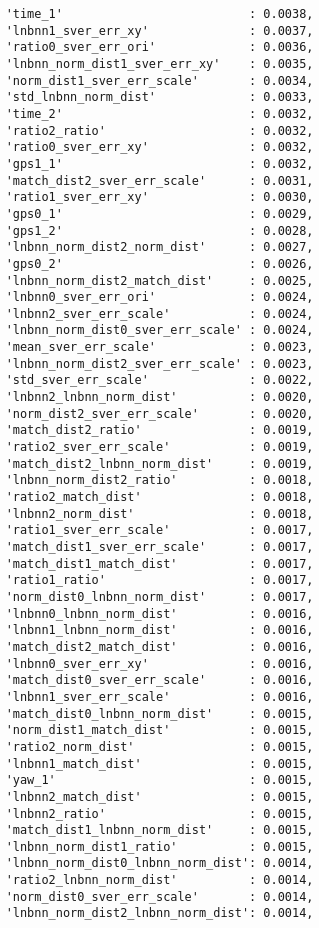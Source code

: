 \begin{verbatim}
    'time_1'                          : 0.0038,
    'lnbnn1_sver_err_xy'              : 0.0037,
    'ratio0_sver_err_ori'             : 0.0036,
    'lnbnn_norm_dist1_sver_err_xy'    : 0.0035,
    'norm_dist1_sver_err_scale'       : 0.0034,
    'std_lnbnn_norm_dist'             : 0.0033,
    'time_2'                          : 0.0032,
    'ratio2_ratio'                    : 0.0032,
    'ratio0_sver_err_xy'              : 0.0032,
    'gps1_1'                          : 0.0032,
    'match_dist2_sver_err_scale'      : 0.0031,
    'ratio1_sver_err_xy'              : 0.0030,
    'gps0_1'                          : 0.0029,
    'gps1_2'                          : 0.0028,
    'lnbnn_norm_dist2_norm_dist'      : 0.0027,
    'gps0_2'                          : 0.0026,
    'lnbnn_norm_dist2_match_dist'     : 0.0025,
    'lnbnn0_sver_err_ori'             : 0.0024,
    'lnbnn2_sver_err_scale'           : 0.0024,
    'lnbnn_norm_dist0_sver_err_scale' : 0.0024,
    'mean_sver_err_scale'             : 0.0023,
    'lnbnn_norm_dist2_sver_err_scale' : 0.0023,
    'std_sver_err_scale'              : 0.0022,
    'lnbnn2_lnbnn_norm_dist'          : 0.0020,
    'norm_dist2_sver_err_scale'       : 0.0020,
    'match_dist2_ratio'               : 0.0019,
    'ratio2_sver_err_scale'           : 0.0019,
    'match_dist2_lnbnn_norm_dist'     : 0.0019,
    'lnbnn_norm_dist2_ratio'          : 0.0018,
    'ratio2_match_dist'               : 0.0018,
    'lnbnn2_norm_dist'                : 0.0018,
    'ratio1_sver_err_scale'           : 0.0017,
    'match_dist1_sver_err_scale'      : 0.0017,
    'match_dist1_match_dist'          : 0.0017,
    'ratio1_ratio'                    : 0.0017,
    'norm_dist0_lnbnn_norm_dist'      : 0.0017,
    'lnbnn0_lnbnn_norm_dist'          : 0.0016,
    'lnbnn1_lnbnn_norm_dist'          : 0.0016,
    'match_dist2_match_dist'          : 0.0016,
    'lnbnn0_sver_err_xy'              : 0.0016,
    'match_dist0_sver_err_scale'      : 0.0016,
    'lnbnn1_sver_err_scale'           : 0.0016,
    'match_dist0_lnbnn_norm_dist'     : 0.0015,
    'norm_dist1_match_dist'           : 0.0015,
    'ratio2_norm_dist'                : 0.0015,
    'lnbnn1_match_dist'               : 0.0015,
    'yaw_1'                           : 0.0015,
    'lnbnn2_match_dist'               : 0.0015,
    'lnbnn2_ratio'                    : 0.0015,
    'match_dist1_lnbnn_norm_dist'     : 0.0015,
    'lnbnn_norm_dist1_ratio'          : 0.0015,
    'lnbnn_norm_dist0_lnbnn_norm_dist': 0.0014,
    'ratio2_lnbnn_norm_dist'          : 0.0014,
    'norm_dist0_sver_err_scale'       : 0.0014,
    'lnbnn_norm_dist2_lnbnn_norm_dist': 0.0014,

\end{verbatim}
